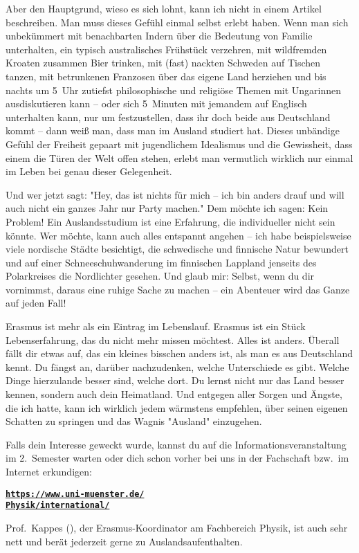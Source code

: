 \begin{multicols}{2}
Aber den Hauptgrund, wieso es sich lohnt, kann ich nicht in einem Artikel beschreiben.
Man muss dieses Gefühl einmal selbst erlebt haben.
Wenn man sich unbekümmert mit benachbarten Indern über die Bedeutung von Familie unterhalten, ein typisch australisches Frühstück verzehren, mit wildfremden Kroaten zusammen Bier trinken, mit (fast) nackten Schweden auf Tischen tanzen, mit betrunkenen Franzosen über das eigene Land herziehen und bis nachts um 5~Uhr zutiefst philosophische und religiöse Themen mit Ungarinnen ausdiskutieren kann – oder sich 5~Minuten mit jemandem auf Englisch unterhalten kann, nur um festzustellen, dass ihr doch beide aus Deutschland kommt – dann weiß man, dass man im Ausland studiert hat.
Dieses unbändige Gefühl der Freiheit gepaart mit jugendlichem Idealismus und die Gewissheit, dass einem die Türen der Welt offen stehen, erlebt man vermutlich wirklich nur einmal im Leben bei genau dieser Gelegenheit.

Und wer jetzt sagt:
"Hey, das ist nichts für mich – ich bin anders drauf und will auch nicht ein ganzes Jahr nur Party machen."
Dem möchte ich sagen: Kein Problem!
Ein Auslandsstudium ist eine Erfahrung, die individueller nicht sein könnte.
Wer möchte, kann auch alles entspannt angehen – ich habe beispielsweise viele nordische Städte besichtigt, die schwedische und finnische Natur bewundert und auf einer Schneeschuhwanderung im finnischen Lappland jenseits des Polarkreises die Nordlichter gesehen.
Und glaub mir: Selbst, wenn du dir vornimmst, daraus eine ruhige Sache zu machen – ein Abenteuer wird das Ganze auf jeden Fall!

Erasmus ist mehr als ein Eintrag im Lebenslauf.
Erasmus ist ein Stück Lebenserfahrung, das du nicht mehr missen möchtest.
Alles ist anders.
Überall fällt dir etwas auf, das ein kleines bisschen anders ist, als man es aus Deutschland kennt.
Du fängst an, darüber nachzudenken, welche Unterschiede es gibt.
Welche Dinge hierzulande besser sind, welche dort.
Du lernst nicht nur das Land besser kennen, sondern auch dein Heimatland.
Und entgegen aller Sorgen und Ängste, die ich hatte, kann ich wirklich jedem wärmstens empfehlen, über seinen eigenen Schatten zu springen und das Wagnis "Ausland" einzugehen.

Falls dein Interesse geweckt wurde, kannst du auf die Informationsveranstaltung im 2.~Semester warten oder dich schon vorher bei uns in der Fachschaft bzw.\ im Internet erkundigen:
\begin{center}
	\href{https://www.uni-muenster.de/Physik/international/}{\textbf{\texttt{https://www.uni-muenster.de/\\Physik/international/}}}
\end{center}

Prof.~Kappes (), der Erasmus-Koordinator am Fachbereich Physik, ist auch sehr nett und berät jederzeit gerne zu Auslandsaufenthalten.

\end{multicols}
